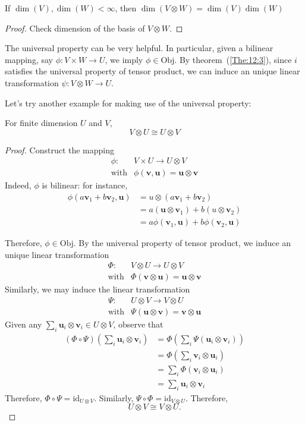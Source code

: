 \begin{corollary}
If $\dim(V),\dim(W)<\infty$, then $\dim(V\otimes W)=\dim(V)\dim(W)$
\end{corollary}
\begin{proof}
Check dimension of the basis of $V\otimes W$. 
\end{proof}


\begin{remark}
The universal property can be very helpful.
In particular, given a bilinear mapping, say $\phi: V\times W\to U$, we imply $\phi\in\text{Obj}$.
By theorem~(\ref{The:12:3}), since $i$ satisfies the universal property of tensor product, we can induce an unique linear transformation $\psi:V\otimes W\to U$.
\end{remark}

Let's try another example for making use of the universal property:
\begin{theorem}
For finite dimension $U$ and $V$,
\[
V\otimes U\cong U\otimes V
\]
\end{theorem}
\begin{proof}
Construct the mapping 
\[
\begin{array}{ll}
\phi:&V\times U\to U\otimes V\\
\text{with}&\phi(\bm v,\bm u) = \bm u\otimes \bm v
\end{array}
\]
Indeed, $\phi$ is bilinear: for instance,
\begin{align*}
\phi(a\bm v_1+b\bm v_2,\bm u)&=
u\otimes(a\bm v_1+b\bm v_2)\\
&=a(\bm u\otimes\bm v_1)+b(u\otimes\bm v_2)\\
&=a\phi(\bm v_1,\bm u)+b\phi(\bm v_2,\bm u)
\end{align*}

Therefore, $\phi\in\text{Obj}$. By the universal property of tensor product, we induce an unique linear transformation
\[
\begin{array}{ll}
\Phi:&V\otimes U\to U\otimes V\\
\text{with}&\Phi(\bm v\otimes\bm u)=\bm u\otimes\bm v
\end{array}
\]
Similarly, we may induce the linear transformation
\[
\begin{array}{ll}
\Psi:&U\otimes V\to V\otimes U\\
\text{with}&\Psi(\bm u\otimes\bm v)=\bm v\otimes\bm u
\end{array}
\]
Given any $\sum_i\bm u_i\otimes\bm v_i\in U\otimes V$, observe that 
\begin{align*}
(\Phi\circ\Psi)\left(\sum_i\bm u_i\otimes\bm v_i\right)
&=
\Phi\left(\sum_i\Psi(\bm u_i\otimes\bm v_i)\right)\\
&=
\Phi\left(\sum_i\bm v_i\otimes\bm u_i\right)\\
&=
\sum_i\Phi\left(\bm v_i\otimes\bm u_i\right)\\
&=
\sum_i\bm u_i\otimes\bm v_i
\end{align*}
Therefore, $\Phi\circ\Psi=\text{id}_{U\otimes V}$.
Similarly, $\Psi\circ\Phi = \text{id}_{V\otimes U}$.
Therefore,
\[
U\otimes V\cong
V\otimes U.
\]
\end{proof}


